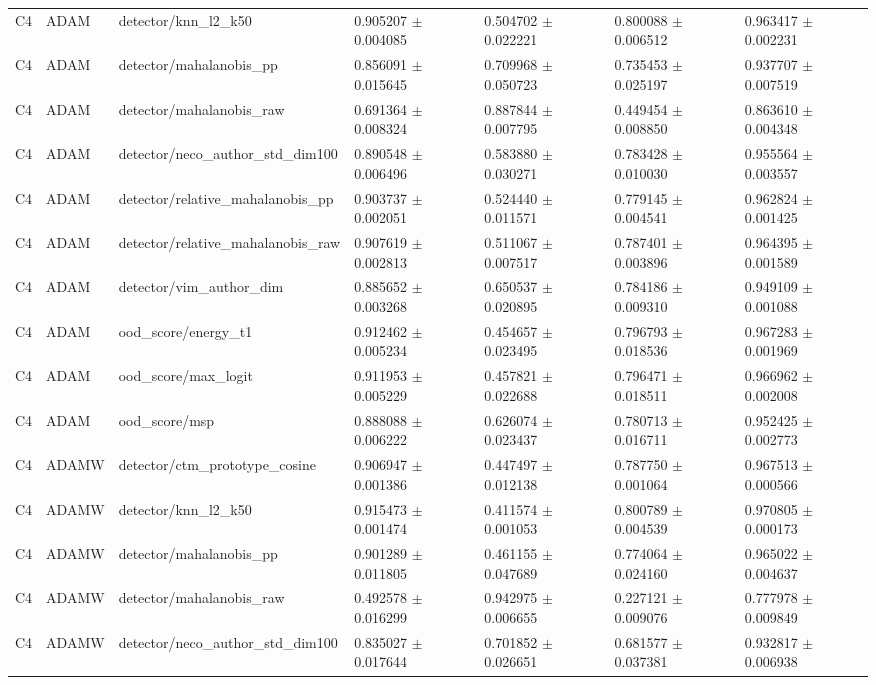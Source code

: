 \begin{longtable}{lllllll}
C4 & ADAM & detector/knn\_l2\_k50 & 0.905207 $\pm$ 0.004085 & 0.504702 $\pm$ 0.022221 & 0.800088 $\pm$ 0.006512 & 0.963417 $\pm$ 0.002231 \\
C4 & ADAM & detector/mahalanobis\_pp & 0.856091 $\pm$ 0.015645 & 0.709968 $\pm$ 0.050723 & 0.735453 $\pm$ 0.025197 & 0.937707 $\pm$ 0.007519 \\
C4 & ADAM & detector/mahalanobis\_raw & 0.691364 $\pm$ 0.008324 & 0.887844 $\pm$ 0.007795 & 0.449454 $\pm$ 0.008850 & 0.863610 $\pm$ 0.004348 \\
C4 & ADAM & detector/neco\_author\_std\_dim100 & 0.890548 $\pm$ 0.006496 & 0.583880 $\pm$ 0.030271 & 0.783428 $\pm$ 0.010030 & 0.955564 $\pm$ 0.003557 \\
C4 & ADAM & detector/relative\_mahalanobis\_pp & 0.903737 $\pm$ 0.002051 & 0.524440 $\pm$ 0.011571 & 0.779145 $\pm$ 0.004541 & 0.962824 $\pm$ 0.001425 \\
C4 & ADAM & detector/relative\_mahalanobis\_raw & 0.907619 $\pm$ 0.002813 & 0.511067 $\pm$ 0.007517 & 0.787401 $\pm$ 0.003896 & 0.964395 $\pm$ 0.001589 \\
C4 & ADAM & detector/vim\_author\_dim & 0.885652 $\pm$ 0.003268 & 0.650537 $\pm$ 0.020895 & 0.784186 $\pm$ 0.009310 & 0.949109 $\pm$ 0.001088 \\
C4 & ADAM & ood\_score/energy\_t1 & 0.912462 $\pm$ 0.005234 & 0.454657 $\pm$ 0.023495 & 0.796793 $\pm$ 0.018536 & 0.967283 $\pm$ 0.001969 \\
C4 & ADAM & ood\_score/max\_logit & 0.911953 $\pm$ 0.005229 & 0.457821 $\pm$ 0.022688 & 0.796471 $\pm$ 0.018511 & 0.966962 $\pm$ 0.002008 \\
C4 & ADAM & ood\_score/msp & 0.888088 $\pm$ 0.006222 & 0.626074 $\pm$ 0.023437 & 0.780713 $\pm$ 0.016711 & 0.952425 $\pm$ 0.002773 \\
C4 & ADAMW & detector/ctm\_prototype\_cosine & 0.906947 $\pm$ 0.001386 & 0.447497 $\pm$ 0.012138 & 0.787750 $\pm$ 0.001064 & 0.967513 $\pm$ 0.000566 \\
C4 & ADAMW & detector/knn\_l2\_k50 & 0.915473 $\pm$ 0.001474 & 0.411574 $\pm$ 0.001053 & 0.800789 $\pm$ 0.004539 & 0.970805 $\pm$ 0.000173 \\
C4 & ADAMW & detector/mahalanobis\_pp & 0.901289 $\pm$ 0.011805 & 0.461155 $\pm$ 0.047689 & 0.774064 $\pm$ 0.024160 & 0.965022 $\pm$ 0.004637 \\
C4 & ADAMW & detector/mahalanobis\_raw & 0.492578 $\pm$ 0.016299 & 0.942975 $\pm$ 0.006655 & 0.227121 $\pm$ 0.009076 & 0.777978 $\pm$ 0.009849 \\
C4 & ADAMW & detector/neco\_author\_std\_dim100 & 0.835027 $\pm$ 0.017644 & 0.701852 $\pm$ 0.026651 & 0.681577 $\pm$ 0.037381 & 0.932817 $\pm$ 0.006938 \\

\end{longtable}
